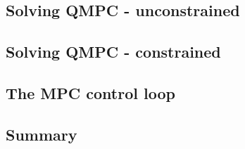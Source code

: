 \subsection{Solving QMPC - unconstrained}
\label{cap:qmpc_unconstrained}



\subsection{Solving QMPC - constrained}
\label{cap:qmpc_constrained}


\subsection{The MPC control loop}
\label{cap:qmpc_control_loop}

\subsection{Summary}
